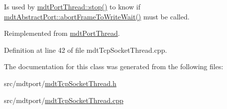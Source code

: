 Is used by \hyperlink{classmdt_port_thread_a5746ea96689ed80179751ad1353f0b39}{mdt\-Port\-Thread\-::stop()} to know if \hyperlink{classmdt_abstract_port_ae67c815f68317c70e398eaa86622af6b}{mdt\-Abstract\-Port\-::abort\-Frame\-To\-Write\-Wait()} must be called. 

Reimplemented from \hyperlink{classmdt_port_thread_a0122a12262052cf3643241a3eaa31c58}{mdt\-Port\-Thread}.



Definition at line 42 of file mdt\-Tcp\-Socket\-Thread.\-cpp.



The documentation for this class was generated from the following files\-:\begin{DoxyCompactItemize}
\item 
src/mdtport/\hyperlink{mdt_tcp_socket_thread_8h}{mdt\-Tcp\-Socket\-Thread.\-h}\item 
src/mdtport/\hyperlink{mdt_tcp_socket_thread_8cpp}{mdt\-Tcp\-Socket\-Thread.\-cpp}\end{DoxyCompactItemize}
